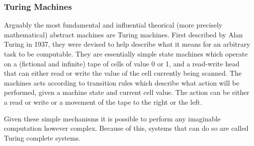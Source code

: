 \subsubsection{Turing Machines}

Arguably the most fundamental and influential theorical (more precisely
mathematical) abstract machines are Turing machines. First described by Alan
Turing in 1937\cite{sep-turing-machine}, they were devised to help describe what
it means for an arbitrary task to be computable. They are essentially simple
state machines which operate on a (fictional and infinite) tape of cells of
value 0 or 1, and a read-write head that can either read or write the value of
the cell currently being scanned\cite{sep-turing-machine}. The machines acts
according to transition rules which describe what action will be performed,
given a machine state and current cell value. The action can be either a read or
write or a movement of the tape to the right or the left.

Given these simple mechanisms it is possible to perform any imaginable
computation however complex. Because of this, systems that can do so are called
Turing complete systems\cite{NEEDED}.

